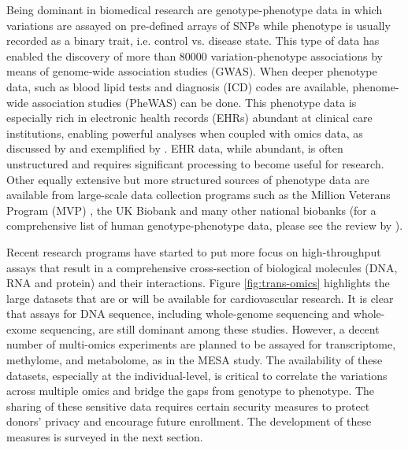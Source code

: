 \documentclass[letter]{bioinfo}
\begin{document}
	Being dominant in biomedical research are genotype-phenotype data in which variations are assayed on pre-defined arrays of SNPs while phenotype is usually recorded as a binary trait, i.e. control vs. disease state. This type of data has enabled the discovery of more than 80000 variation-phenotype associations by means of genome-wide association studies (GWAS).
	When deeper phenotype data, such as blood lipid tests and diagnosis (ICD) codes are available, phenome-wide association studies (PheWAS) can be done. This phenotype data is especially rich in electronic health records (EHRs) abundant at clinical care institutions, enabling powerful analyses when coupled with omics data, as discussed by \cite{Denaxas:2015:Big, Wu:2017:Omic} and exemplified by \cite{Dewey:2016:Distribution,Li:2018:Decoding}.
	EHR data, while abundant, is often unstructured and requires significant processing to become useful for research. Other equally extensive but more structured sources of phenotype data are available from large-scale data collection programs such as the Million Veterans Program (MVP) \citep{Gaziano:2016:Million}, the UK Biobank \citep{Collins:2012:Biobank} and many other national biobanks (for a comprehensive list of human genotype-phenotype data, please see the review by \cite{Brookes:2015:Human}).
	
	Recent research programs have started to put more focus on high-throughput assays that result in a comprehensive cross-section of biological molecules (DNA, RNA and protein) and their interactions.  Figure \ref{fig:trans-omics} highlights the large datasets that are or will be available for cardiovascular research. It is clear that assays for DNA sequence, including whole-genome sequencing and whole-exome sequencing, are still dominant among these studies. However, a decent number of multi-omics experiments are planned to be assayed for transcriptome, methylome, and metabolome, as in the MESA study. The availability of these datasets, especially at the individual-level, is critical to correlate the variations across multiple omics and bridge the gaps from genotype to phenotype. The sharing of these sensitive data requires certain security measures to protect donors' privacy and encourage future enrollment. The development of these measures is surveyed in the next section.
	
\end{document}
